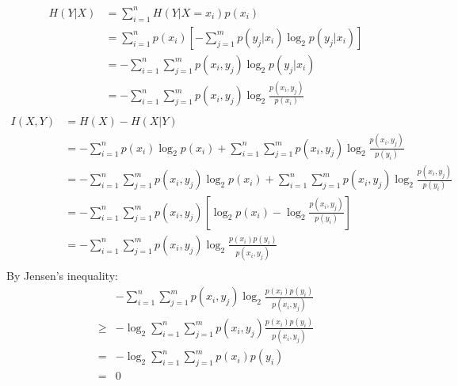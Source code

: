 \documentclass{article}
\begin{document}
\subsection{}
\begin{equation}
\begin{split}
    H(Y|X) &= \sum_{i = 1}^n H(Y|X=x_i)p(x_i)\\
    &= \sum_{i = 1}^n p(x_i) \left[ - \sum_{j = 1}^m p(y_j|x_i)\log_2 p(y_j|x_i) \right]\\
    &= - \sum_{i = 1}^n \sum_{j = 1}^m p(x_i,y_j) \log_2 p(y_j|x_i)\\
    &= - \sum_{i = 1}^n \sum_{j = 1}^m p(x_i,y_j) \log_2 \frac{p(x_i,y_j)}{p(x_i)} \\
\end{split}
\end{equation}
\begin{equation}
\begin{split}
    I(X,Y) &= H(X) - H(X|Y)\\
    &= -\sum_{i = 1}^n p(x_i) \log_2 p(x_i) + \sum_{i = 1}^n \sum_{j = 1}^m p(x_i,y_j) \log_2 \frac{p(x_i,y_j)}{p(y_i)}\\
    &= -\sum_{i = 1}^n \sum_{j = 1}^m p(x_i,y_j) \log_2 p(x_i) + \sum_{i = 1}^n \sum_{j = 1}^m p(x_i,y_j) \log_2 \frac{p(x_i,y_j)}{p(y_i)}\\
    &= -\sum_{i = 1}^n \sum_{j = 1}^m p(x_i,y_j) \left[ \log_2 p(x_i) -\log_2 \frac{p(x_i,y_j)}{p(y_i)} \right]\\
    &= -\sum_{i = 1}^n \sum_{j = 1}^m p(x_i,y_j)\log_2\frac{p(x_i) p(y_i)}{p(x_i,y_j)}\\
\end{split}
\end{equation}
By Jensen's inequality: 
\begin{equation}
    \begin{split}
        &-\sum_{i = 1}^n \sum_{j = 1}^m p(x_i,y_j)\log_2\frac{p(x_i) p(y_i)}{p(x_i,y_j)}\\
        \geq & -\log_2 \sum_{i = 1}^n \sum_{j = 1}^m p(x_i,y_j)\frac{p(x_i) p(y_i)}{p(x_i,y_j)}\\
        = & -\log_2 \sum_{i = 1}^n \sum_{j = 1}^m p(x_i) p(y_i)\\
        = & 0
    \end{split}
\end{equation}
\end{document}
